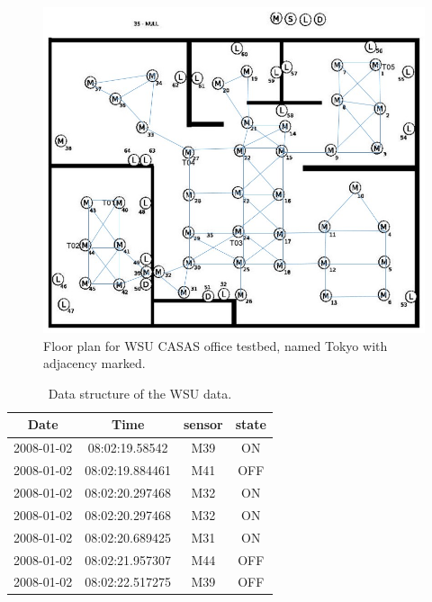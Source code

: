 \begin{figure}[!ht]
\includegraphics[scale=0.5]{./pics/LabSensorsLayout.jpg}
\centering
\caption{Floor plan for WSU CASAS office testbed, named Tokyo with adjacency marked.}
\label{fig:casas}
\end{figure}

\begin{table}[]
\centering
\caption{Data structure of the WSU data.}
\label{tab:WSUDATA}
\begin{tabular}{|c|c|c|c|}
\hline
Date       & Time            & sensor & state \\ \hline
2008-01-02 & 08:02:19.58542  & M39    & ON    \\ \hline
2008-01-02 & 08:02:19.884461 & M41    & OFF   \\ \hline
2008-01-02 & 08:02:20.297468 & M32    & ON    \\ \hline
2008-01-02 & 08:02:20.297468 & M32    & ON    \\ \hline
2008-01-02 & 08:02:20.689425 & M31    & ON    \\ \hline
2008-01-02 & 08:02:21.957307 & M44    & OFF   \\ \hline
2008-01-02 & 08:02:22.517275 & M39    & OFF   \\ \hline
\end{tabular}
\end{table}



